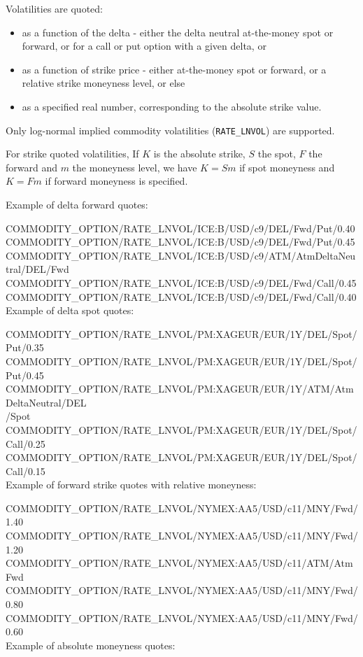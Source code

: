 Volatilities are quoted: 
\begin{itemize}
\item as a function of the delta - either the delta neutral at-the-money spot or forward, or for a call or put option with a given delta, or 
\item as a function of strike price - either at-the-money spot or forward, or a  relative strike moneyness level, or else
\item as a specified real number, corresponding to the absolute strike value.
\end{itemize}
 Only log-normal implied commodity volatilities ({\tt RATE\_LNVOL}) are supported.

For strike quoted volatilities, If $K$ is the absolute strike, $S$ the spot, $F$ the forward and $m$ the moneyness level, we have $K=Sm$ if spot
moneyness and $K=Fm$ if forward moneyness is specified.

\medskip
Example of delta forward quotes:

COMMODITY\_OPTION/RATE\_LNVOL/ICE:B/USD/c9/DEL/Fwd/Put/0.40\\
COMMODITY\_OPTION/RATE\_LNVOL/ICE:B/USD/c9/DEL/Fwd/Put/0.45\\
COMMODITY\_OPTION/RATE\_LNVOL/ICE:B/USD/c9/ATM/AtmDeltaNeutral/DEL/Fwd\\
COMMODITY\_OPTION/RATE\_LNVOL/ICE:B/USD/c9/DEL/Fwd/Call/0.45\\
COMMODITY\_OPTION/RATE\_LNVOL/ICE:B/USD/c9/DEL/Fwd/Call/0.40\\
\medskip
Example of delta spot quotes:

COMMODITY\_OPTION/RATE\_LNVOL/PM:XAGEUR/EUR/1Y/DEL/Spot/Put/0.35\\
COMMODITY\_OPTION/RATE\_LNVOL/PM:XAGEUR/EUR/1Y/DEL/Spot/Put/0.45\\
COMMODITY\_OPTION/RATE\_LNVOL/PM:XAGEUR/EUR/1Y/ATM/AtmDeltaNeutral/DEL\\/Spot\\
COMMODITY\_OPTION/RATE\_LNVOL/PM:XAGEUR/EUR/1Y/DEL/Spot/Call/0.25\\
COMMODITY\_OPTION/RATE\_LNVOL/PM:XAGEUR/EUR/1Y/DEL/Spot/Call/0.15\\
\medskip
Example of forward strike quotes with relative moneyness:

COMMODITY\_OPTION/RATE\_LNVOL/NYMEX:AA5/USD/c11/MNY/Fwd/1.40\\
COMMODITY\_OPTION/RATE\_LNVOL/NYMEX:AA5/USD/c11/MNY/Fwd/1.20\\
COMMODITY\_OPTION/RATE\_LNVOL/NYMEX:AA5/USD/c11/ATM/AtmFwd\\
COMMODITY\_OPTION/RATE\_LNVOL/NYMEX:AA5/USD/c11/MNY/Fwd/0.80\\
COMMODITY\_OPTION/RATE\_LNVOL/NYMEX:AA5/USD/c11/MNY/Fwd/0.60	\\
\medskip
Example of absolute moneyness quotes:

